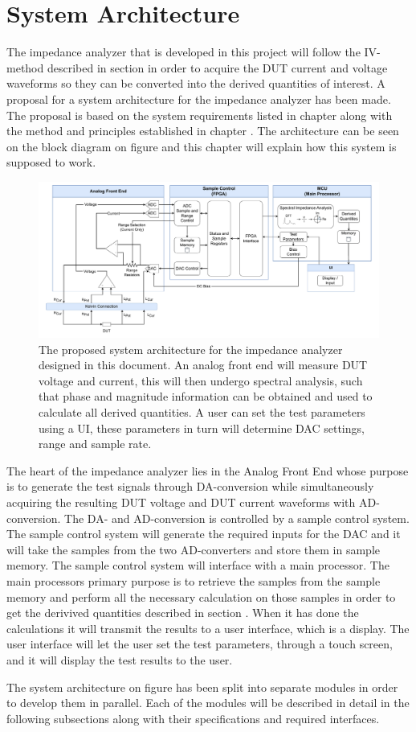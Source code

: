 \chapter{System Architecture} \label{ch:SysArchitecture}

The impedance analyzer that is developed in this project will follow the IV-method described in section  in order to acquire the DUT current and voltage waveforms so they can be converted into the derived quantities of interest. A proposal for a system architecture for the impedance analyzer has been made. The proposal is based on the system requirements listed in chapter  along with the method and principles established in chapter . The architecture can be seen on the block diagram on figure  and this chapter will explain how this system is supposed to work.

\begin{figure}[H]
    \centering
    \includegraphics[clip, trim=18 0 18 0,width=1.0\textwidth]{Sections/6_SystemArchitecture/Figures/SystemArchitecture.pdf}
    \caption{The proposed system architecture for the impedance analyzer designed in this document. An analog front end will measure DUT voltage and current, 
    this will then undergo spectral analysis, such that phase and magnitude information can be obtained and used to calculate all derived quantities. A user can set the test parameters using a UI, these parameters in turn will determine DAC settings, range and sample rate.}
    \label{fig_6_SysArchitecture}
\end{figure}

The heart of the impedance analyzer lies in the Analog Front End whose purpose is to generate the test signals through DA-conversion while simultaneously acquiring the resulting DUT voltage and DUT current waveforms with AD-conversion. The DA- and AD-conversion is controlled by a sample control system. The sample control system will generate the required inputs for the DAC and it will take the samples from the two AD-converters and store them in sample memory. The sample control system will interface with a main processor. The main processors primary purpose is to retrieve the samples from the sample memory and perform all the necessary calculation on those samples in order to get the derivived quantities described in section . When it has done the calculations it will transmit the results to a user interface, which is a display. The user interface will let the user set the test parameters, through a touch screen, and it will display the test results to the user.

The system architecture on figure  has been split into separate modules in order to develop them in parallel. Each of the modules will be described in detail in the following subsections along with their specifications and required interfaces.
